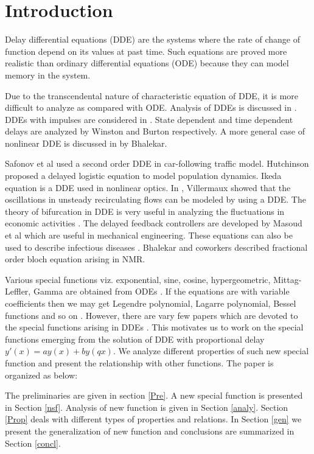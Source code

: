 \documentclass[12pt]{article}
\numberwithin{equation}{section}
\begin{document}
\section{Introduction}
Delay differential equations (DDE) are the systems where the rate of change of function depend on its values at past time. Such equations are proved more realistic than ordinary differential equations (ODE) because they can model memory in the system.
\par Due to the transcendental nature of characteristic equation of DDE, it is more difficult to analyze as compared with ODE. Analysis of DDEs is discussed in \cite{Bellman,Hale,Gopalsamy,Henry}. DDEs with impulses are considered in \cite{Gopalsarny}. State dependent and time dependent delays are analyzed by Winston \cite{Winston} and Burton \cite{Burton} respectively. A more general case of nonlinear DDE is discussed in \cite{Bhalekar} by Bhalekar.
\par Safonov et al \cite{Safonov} used a second order DDE in car-following traffic model. Hutchinson \cite{Hutchinson} proposed a delayed logistic equation to model population dynamics. Ikeda \cite{Ikeda} equation is a DDE used in nonlinear optics. In \cite{Villermaux}, Villermaux showed that the oscillations in unsteady recirculating flows can be modeled by using a DDE. The theory of bifurcation in DDE is very useful in analyzing the fluctuations in economic activities  \cite{Mackey,Boucekkine,Torre}. The delayed feedback controllers are developed by Masoud et al \cite{Masoud} which are useful in mechanical engineering. These equations can also be used to describe infectious diseases  \cite{Ciupe,Cooke,Nelson}. Bhalekar and coworkers \cite{Bhalekar1,Bhalekar2} described fractional order bloch equation arising in NMR.
\par Various special functions viz. exponential, sine, cosine, hypergeometric, Mittag-Leffler, Gamma are obtained from ODEs \cite{Andrews,Mathai,Rainville}. If the equations are with variable coefficients then we may get Legendre polynomial, Lagarre polynomial, Bessel functions and so on \cite{Bell,Sneddon}. However, there are vary few papers which are  devoted to  the special functions arising in DDEs \cite{Corless}. This motivates us to work on the special functions emerging from the solution of DDE with proportional delay $ y'(x) = ay(x)+ by(q x)$. We analyze different properties of such new special function and present the relationship with other functions. The paper is organized as below: 

\par The preliminaries are given in section \ref{Pre}. A new special function is presented in Section \ref{nsf}. Analysis of new function is given in Section \ref{analy}. Section \ref{Prop} deals with different types of properties and relations.  In Section \ref{gen}  we present the generalization of  new function and conclusions are summarized in Section \ref{concl}.
\end{document}
